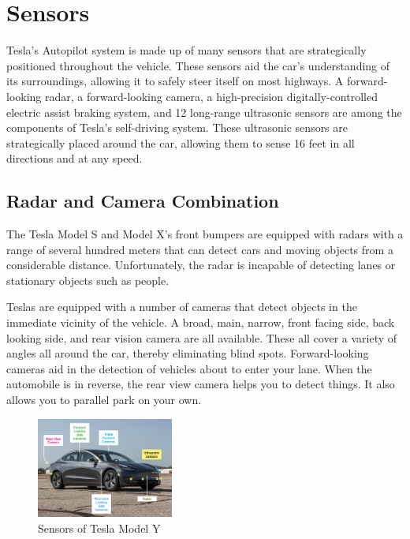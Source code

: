 \documentclass[letterpaper, 10 pt, conference]{ieeeconf}  %
\begin{document}
\section{Sensors}

Tesla's Autopilot system is made up of many sensors that are strategically positioned throughout the vehicle. These sensors aid the car's understanding of its surroundings, allowing it to safely steer itself on most highways. A forward-looking radar, a forward-looking camera, a high-precision digitally-controlled electric assist braking system, and 12 long-range ultrasonic sensors are among the components of Tesla's self-driving system. These ultrasonic sensors are strategically placed around the car, allowing them to sense 16 feet in all directions and at any speed\cite{polyarush2019does}.

\subsection{Radar and Camera Combination} The Tesla Model S and Model X's front bumpers are equipped with radars with a range of several hundred meters that can detect cars and moving objects from a considerable distance. Unfortunately, the radar is incapable of detecting lanes or stationary objects such as people\cite{ingle2016tesla}. 

Teslas are equipped with a number of cameras that detect objects in the immediate vicinity of the vehicle. A broad, main, narrow, front facing side, back looking side, and rear vision camera are all available. These all cover a variety of angles all around the car, thereby eliminating blind spots\cite{ingle2016tesla}. Forward-looking cameras aid in the detection of vehicles about to enter your lane. When the automobile is in reverse, the rear view camera helps you to detect things. It also allows you to parallel park on your own.

\begin{figure}[hbt!]
\centering
\includegraphics[width=0.4\textwidth]{gfx/teslaautopilot-sensors.png}
\caption{Sensors of Tesla Model Y}
\end{figure}
\end{document}

